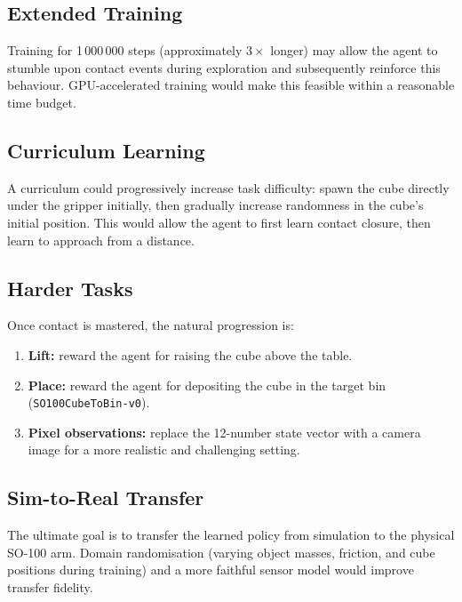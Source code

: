 \documentclass[conference]{IEEEtran}
\begin{document}
\subsection{Extended Training}

Training for 1\,000\,000 steps (approximately $3\times$ longer)
may allow the agent to stumble upon contact events during
exploration and subsequently reinforce this behaviour.
GPU-accelerated training would make this feasible within a
reasonable time budget.

\subsection{Curriculum Learning}

A curriculum could progressively increase task difficulty:
spawn the cube directly under the gripper initially, then
gradually increase randomness in the cube's initial position.
This would allow the agent to first learn contact closure, then
learn to approach from a distance.

\subsection{Harder Tasks}

Once contact is mastered, the natural progression is:
\begin{enumerate}
    \item \textbf{Lift:} reward the agent for raising the cube
          above the table.
    \item \textbf{Place:} reward the agent for depositing the
          cube in the target bin (\texttt{SO100CubeToBin-v0}).
    \item \textbf{Pixel observations:} replace the 12-number
          state vector with a camera image for a more realistic
          and challenging setting.
\end{enumerate}

\subsection{Sim-to-Real Transfer}

The ultimate goal is to transfer the learned policy from simulation
to the physical SO-100 arm.
Domain randomisation (varying object masses, friction, and cube
positions during training) and a more faithful sensor model would
improve transfer fidelity.


\end{document}
